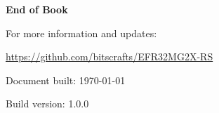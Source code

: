 \documentclass[11pt,a4paper,twoside,openright]{book}
\begin{document}
\printbibliography[heading=bibintoc]
\clearpage


\thispagestyle{empty}
\begin{center}
    \vspace*{\fill}
    {\huge\bfseries End of Book}

    \vspace{2em}
    {\large For more information and updates:}

    \url{https://github.com/bitscrafts/EFR32MG2X-RS}

    \vspace{2em}
    Document built: \today

    Build version: 1.0.0
    \vspace*{\fill}
\end{center}
\end{document}
